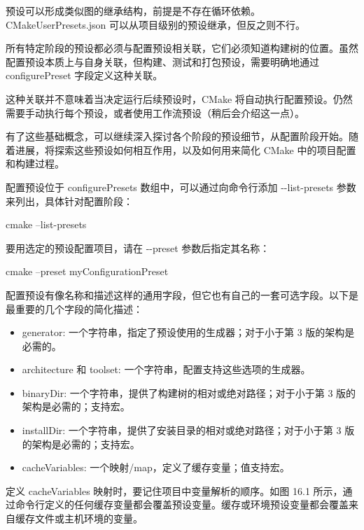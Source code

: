 预设可以形成类似图的继承结构，前提是不存在循环依赖。CMakeUserPresets.json 可以从项目级别的预设继承，但反之则不行。


所有特定阶段的预设都必须与配置预设相关联，它们必须知道构建树的位置。虽然配置预设本质上与自身关联，但构建、测试和打包预设，需要明确地通过 configurePreset 字段定义这种关联。

这种关联并不意味着当决定运行后续预设时，CMake 将自动执行配置预设。仍然需要手动执行每个预设，或者使用工作流预设（稍后会介绍这一点）。

有了这些基础概念，可以继续深入探讨各个阶段的预设细节，从配置阶段开始。随着进展，将探索这些预设如何相互作用，以及如何用来简化 CMake 中的项目配置和构建过程。


配置预设位于 configurePresets 数组中，可以通过向命令行添加 -{}-list-presets 参数来列出，具体针对配置阶段：

\begin{shell}
cmake --list-presets
\end{shell}

要用选定的预设配置项目，请在 -{}-preset 参数后指定其名称：

\begin{shell}
cmake --preset myConfigurationPreset
\end{shell}

配置预设有像名称和描述这样的通用字段，但它也有自己的一套可选字段。以下是最重要的几个字段的简化描述：

\begin{itemize}
\item
generator: 一个字符串，指定了预设使用的生成器；对于小于第 3 版的架构是必需的。

\item
architecture 和 toolset: 一个字符串，配置支持这些选项的生成器。

\item
binaryDir: 一个字符串，提供了构建树的相对或绝对路径；对于小于第 3 版的架构是必需的；支持宏。

\item
installDir: 一个字符串，提供了安装目录的相对或绝对路径；对于小于第 3 版的架构是必需的；支持宏。

\item
cacheVariables: 一个映射/map，定义了缓存变量；值支持宏。
\end{itemize}

定义 cacheVariables 映射时，要记住项目中变量解析的顺序。如图 16.1 所示，通过命令行定义的任何缓存变量都会覆盖预设变量。缓存或环境预设变量都会覆盖来自缓存文件或主机环境的变量。

